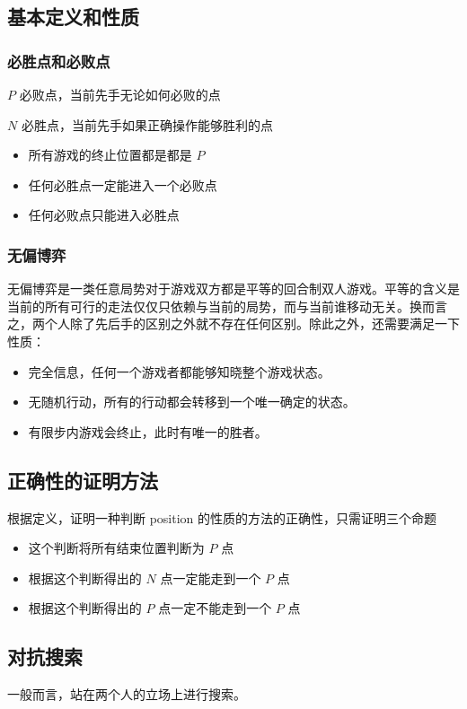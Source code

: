 \documentclass[UTF-8]{ctexart}
\begin{document}
		\subsection{基本定义和性质}
			\subsubsection{必胜点和必败点}
			$P$ 必败点，当前先手无论如何必败的点  
			
			$N$ 必胜点，当前先手如果正确操作能够胜利的点
			\begin{itemize}
				\item 所有游戏的终止位置都是都是 $P$   
				\item 任何必胜点一定能进入一个必败点  
				\item 任何必败点只能进入必胜点
			\end{itemize}
			\subsubsection{无偏博弈}
			无偏博弈是一类任意局势对于游戏双方都是平等的回合制双人游戏。平等的含义是当前的所有可行的走法仅仅只依赖与当前的局势，而与当前谁移动无关。换而言之，两个人除了先后手的区别之外就不存在任何区别。除此之外，还需要满足一下性质：  
			\begin{itemize}
				\item 完全信息，任何一个游戏者都能够知晓整个游戏状态。  
				\item 无随机行动，所有的行动都会转移到一个唯一确定的状态。  
				\item 有限步内游戏会终止，此时有唯一的胜者。
			\end{itemize}
		\subsection{正确性的证明方法}
			根据定义，证明一种判断 position 的性质的方法的正确性，只需证明三个命题
			
			\begin{itemize}
				\item 这个判断将所有结束位置判断为 $P$ 点
				\item 根据这个判断得出的 $N$ 点一定能走到一个 $P$ 点
				\item 根据这个判断得出的 $P$ 点一定不能走到一个 $P$ 点
			\end{itemize}
		\subsection{对抗搜索}
		一般而言，站在两个人的立场上进行搜索。
		
\end{document}
